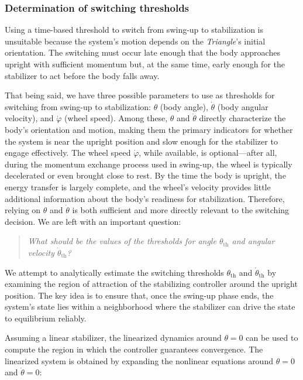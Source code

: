 \documentclass{article}
\begin{document}
\subsubsection{Determination of switching thresholds}

Using a time-based threshold to switch from swing-up to stabilization is unsuitable because the system's motion depends on the \textit{Triangle}'s initial orientation. The switching must occur late enough that the body approaches upright with sufficient momentum but, at the same time, early enough for the stabilizer to act before the body falls away.

That being said, we have three possible parameters to use as thresholds for switching from swing-up to stabilization: $\theta$ (body angle), $\dot{\theta}$ (body angular velocity), and $\dot{\varphi}$ (wheel speed). Among these, $\theta$ and $\dot{\theta}$ directly characterize the body's orientation and motion, making them the primary indicators for whether the system is near the upright position and slow enough for the stabilizer to engage effectively. The wheel speed $\dot{\varphi}$, while available, is optional---after all, during the momentum exchange process used in swing-up, the wheel is typically decelerated or even brought close to rest. By the time the body is upright, the energy transfer is largely complete, and the wheel's velocity provides little additional information about the body's readiness for stabilization. Therefore, relying on $\theta$ and $\dot{\theta}$ is both sufficient and more directly relevant to the switching decision. We are left with an important question:
\begin{quote}
  \textit{What should be the values of the thresholds for angle $\theta_{\text{th}}$ and angular velocity $\dot{\theta}_{\text{th}}$?}
\end{quote}

We attempt to analytically estimate the switching thresholds $\theta_{\text{th}}$ and $\dot{\theta}_{\text{th}}$ by examining the region of attraction of the stabilizing controller around the upright position. The key idea is to ensure that, once the swing-up phase ends, the system's state lies within a neighborhood where the stabilizer can drive the state to equilibrium reliably.

Assuming a linear stabilizer, the linearized dynamics around $\theta = 0$ can be used to compute the region in which the controller guarantees convergence. The linearized system is obtained by expanding the nonlinear equations around $\theta = 0$ and $\dot{\theta} = 0$:
\end{document}
